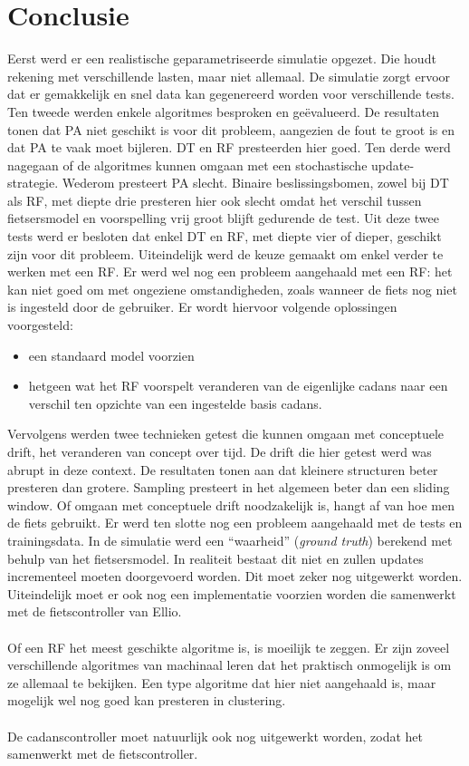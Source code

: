 \chapter{Conclusie}
Eerst werd er een realistische geparametriseerde simulatie opgezet. Die houdt rekening met verschillende lasten, maar niet allemaal. De simulatie zorgt ervoor dat er gemakkelijk en snel data kan gegenereerd worden voor verschillende tests. Ten tweede werden enkele algoritmes besproken en geëvalueerd. De resultaten tonen dat PA niet geschikt is voor dit probleem, aangezien de fout te groot is en dat PA te vaak moet bijleren. DT en RF presteerden hier goed. Ten derde werd nagegaan of de algoritmes kunnen omgaan met een stochastische update-strategie. Wederom presteert PA slecht. Binaire beslissingsbomen, zowel bij DT als RF, met diepte drie presteren hier ook slecht omdat het verschil tussen fietsersmodel en voorspelling vrij groot blijft gedurende de test. Uit deze twee tests werd er besloten dat enkel DT en RF, met diepte vier of dieper, geschikt zijn voor dit probleem. Uiteindelijk werd de keuze gemaakt om enkel verder te werken met een RF. Er werd wel nog een probleem aangehaald met een RF: het kan niet goed om met ongeziene omstandigheden, zoals wanneer de fiets nog niet is ingesteld door de gebruiker. Er wordt hiervoor volgende oplossingen voorgesteld: 

\begin{itemize}
\item een standaard model voorzien
\item hetgeen wat het RF voorspelt veranderen van de eigenlijke cadans naar een verschil ten opzichte van een ingestelde basis cadans.
\end{itemize}

\noindent Vervolgens werden twee technieken getest die kunnen omgaan met conceptuele drift, het veranderen van concept over tijd. De drift die hier getest werd was abrupt in deze context. De resultaten tonen aan dat kleinere structuren beter presteren dan grotere. Sampling presteert in het algemeen beter dan een sliding window. Of omgaan met conceptuele drift noodzakelijk is, hangt af van hoe men de fiets gebruikt. Er werd ten slotte nog een probleem aangehaald met de tests en trainingsdata. In de simulatie werd een “waarheid” (\textit{ground truth}) berekend met behulp van het fietsersmodel. In realiteit bestaat dit niet en zullen updates incrementeel moeten doorgevoerd worden. Dit moet zeker nog uitgewerkt worden. Uiteindelijk moet er ook nog een implementatie voorzien worden die samenwerkt met de fietscontroller van Ellio.
\\\\
Of een RF het meest geschikte algoritme is, is moeilijk te zeggen. Er zijn zoveel verschillende algoritmes van machinaal leren dat het praktisch onmogelijk is om ze allemaal te bekijken. Een type algoritme dat hier niet aangehaald is, maar mogelijk wel nog goed kan presteren in clustering.
\\\\
De cadanscontroller moet natuurlijk ook nog uitgewerkt worden, zodat het samenwerkt met de fietscontroller.